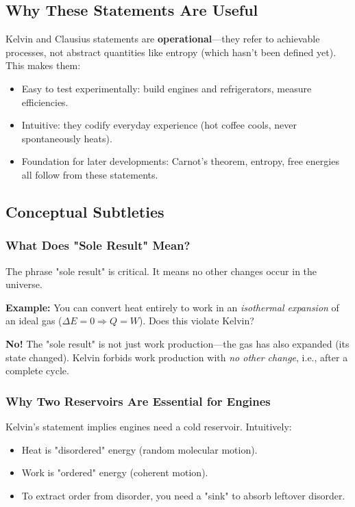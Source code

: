 \documentclass[9pt,twocoloumn]{article}
\begin{document}
\subsection{Why These Statements Are Useful}

Kelvin and Clausius statements are \textbf{operational}—they refer to achievable processes, not abstract quantities like entropy (which hasn't been defined yet). This makes them:
\begin{itemize}
    \item Easy to test experimentally: build engines and refrigerators, measure efficiencies.
    \item Intuitive: they codify everyday experience (hot coffee cools, never spontaneously heats).
    \item Foundation for later developments: Carnot's theorem, entropy, free energies all follow from these statements.
\end{itemize}

\subsection{Conceptual Subtleties}

\subsubsection{What Does "Sole Result" Mean?}
The phrase "sole result" is critical. It means no other changes occur in the universe.

\textbf{Example:} You can convert heat entirely to work in an \emph{isothermal expansion} of an ideal gas ($\Delta E = 0 \Rightarrow Q = W$). Does this violate Kelvin?

\textbf{No!} The "sole result" is not just work production—the gas has also expanded (its state changed). Kelvin forbids work production with \emph{no other change}, i.e., after a complete cycle.

\subsubsection{Why Two Reservoirs Are Essential for Engines}
Kelvin's statement implies engines need a cold reservoir. Intuitively:
\begin{itemize}
    \item Heat is "disordered" energy (random molecular motion).
    \item Work is "ordered" energy (coherent motion).
    \item To extract order from disorder, you need a "sink" to absorb leftover disorder.
\end{itemize}
\end{document}
